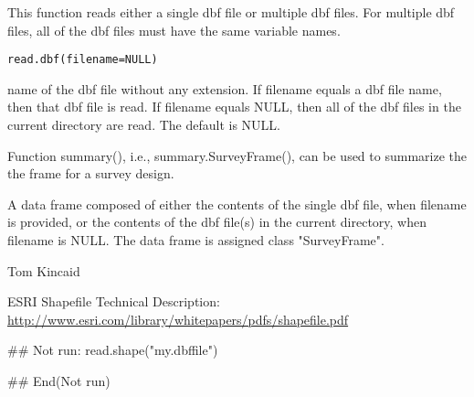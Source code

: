 \begin{Description}\relax
This function reads either a single dbf file or multiple dbf files.  For 
multiple dbf files, all of the dbf files must have the same variable names.
\end{Description}
\begin{Usage}
\begin{verbatim}
read.dbf(filename=NULL)
\end{verbatim}
\end{Usage}
\begin{Arguments}
\begin{ldescription}
\item[\code{filename}] name of the dbf file without any extension.  If filename 
equals a dbf file name, then that dbf file is read.  If filename 
equals NULL, then all of the dbf files in the current directory are 
read.  The default is NULL.
\end{ldescription}
\end{Arguments}
\begin{Details}\relax
Function summary(), i.e., summary.SurveyFrame(), can be used to summarize the 
the frame for a survey design.
\end{Details}
\begin{Value}
A data frame composed of either the contents of the single dbf file, when
filename is provided, or the contents of the dbf file(s) in the current
directory, when filename is NULL.  The data frame is assigned class
"SurveyFrame".
\end{Value}
\begin{Author}\relax
Tom Kincaid 
\end{Author}
\begin{References}\relax
ESRI Shapefile Technical Description: 
\url{http://www.esri.com/library/whitepapers/pdfs/shapefile.pdf}
\end{References}
\begin{SeeAlso}\relax
{}
\end{SeeAlso}
\begin{Examples}
\begin{ExampleCode}
  ## Not run: 
  read.shape("my.dbffile")
  
## End(Not run)
\end{ExampleCode}
\end{Examples}

